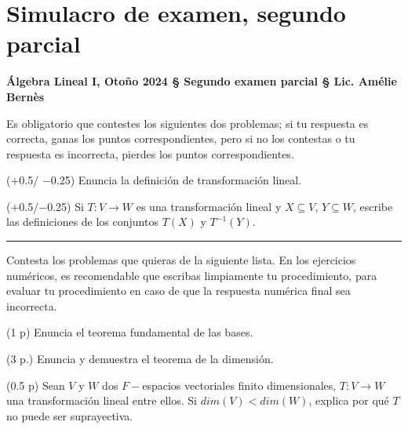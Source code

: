 \section{Simulacro de examen, segundo parcial}

\begin{center}
	\textbf{Álgebra Lineal I, Otoño 2024 
	\hspace{0.1cm}	
	\S 
	\hspace{0.1cm}	
	Segundo examen parcial 
	\hspace{0.1cm}
	\S
	\hspace{0.1cm} 
	Lic. Amélie Bernès}
\end{center}



Es obligatorio que contestes los siguientes dos problemas; si tu 
respuesta es correcta, ganas los puntos correspondientes, pero si no los
contestas o tu respuesta es incorrecta, pierdes los puntos correspondientes.

\begin{prob}
($+$0.5/ $-$0.25) Enuncia la definición de transformación lineal.
\end{prob}

\begin{prob}
($+$0.5/$-$0.25) Si $T: V \longrightarrow W$ es una transformación lineal y 
$X \subseteq V$, 
$Y \subseteq W$, escribe las
definiciones de los conjuntos $T(X)$
y $T^{-1}(Y)$.
\end{prob}

\noindent\rule{\textwidth}{1pt}

Contesta los problemas que quieras de la siguiente lista. 
En los ejercicios numéricos, es recomendable que escribas limpiamente
tu procedimiento, para evaluar tu procedimiento en caso de que
la respuesta numérica final sea incorrecta.


\begin{prob}
(1 p)
Enuncia el teorema fundamental de las bases.
\end{prob}


\begin{prob}
(3 p.)
Enuncia y demuestra el teorema de la dimensión.
\end{prob}


\begin{prob}
(0.5 p) Sean $V$ y $W$ dos $F-$espacios vectoriales finito dimensionales,
$T: V\longrightarrow W$ una transformación lineal entre ellos.
Si $dim(V) < dim(W)$, explica por qué $T$ no puede ser suprayectiva.
\end{prob}


